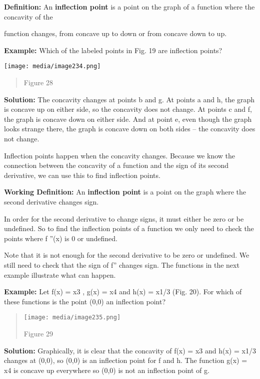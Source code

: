 \textbf{Definition:} An \textbf{inflection point} is a point on the
graph of a function where the concavity of the

function changes, from concave up to down or from concave down to up.

\textbf{Example:} Which of the labeled points in Fig. 19 are inflection
points?

\texttt{[image: media/image234.png]}

\begin{quote}
Figure 28
\end{quote}

\textbf{Solution:} The concavity changes at points b and g. At points a
and h, the graph is concave up on either side, so the concavity does not
change. At points c and f, the graph is concave down on either side. And
at point e, even though the graph looks strange there, the graph is
concave down on both sides -- the concavity does not change.

Inflection points happen when the concavity changes. Because we know the
connection between the concavity of a function and the sign of its
second derivative, we can use this to find inflection points.

\textbf{Working Definition:} An \textbf{inflection point} is a point on
the graph where the second derivative changes sign.

In order for the second derivative to change signs, it must either be
zero or be undefined. So to find the inflection points of a function we
only need to check the points where f ''(x) is 0 or undefined.

Note that it is not enough for the second derivative to be zero or
undefined. We still need to check that the sign of f'' changes sign. The
functions in the next example illustrate what can happen.

\textbf{Example:} Let f(x) = x3 , g(x) = x4 and h(x) = x1/3 (Fig. 20).
For which of these functions is the point (0,0) an inflection point?

\begin{quote}
\texttt{[image: media/image235.png]}

Figure 29
\end{quote}

\textbf{Solution:} Graphically, it is clear that the concavity of f(x) =
x3 and h(x) = x1/3 changes at (0,0), so (0,0) is an inflection point for
f and h. The function g(x) = x4 is concave up everywhere so (0,0) is not
an inflection point of g.

